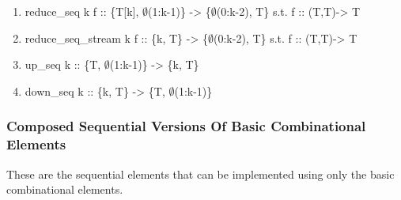 \documentclass[11pt,fleqn]{article}
\numberwithin{equation}{subsection}
\begin{document}
\begin{enumerate}
    \item reduce\_seq k f :: \{T[k], $\emptyset$(1:k-1)\} -> \{$\emptyset$(0:k-2), T\}
        \subitem s.t. f :: (T,T)-> T
    \item reduce\_seq\_stream k f :: \{k, T\} -> \{$\emptyset$(0:k-2), T\}
        \subitem s.t. f :: (T,T)-> T
    \item up\_seq k :: \{T, $\emptyset$(1:k-1)\} -> \{k, T\}
    \item down\_seq k :: \{k, T\} -> \{T, $\emptyset$(1:k-1)\}
\end{enumerate}

\subsubsection{Composed Sequential Versions Of Basic Combinational Elements}
These are the sequential elements that can be implemented using only the basic
combinational elements.
\end{document}
